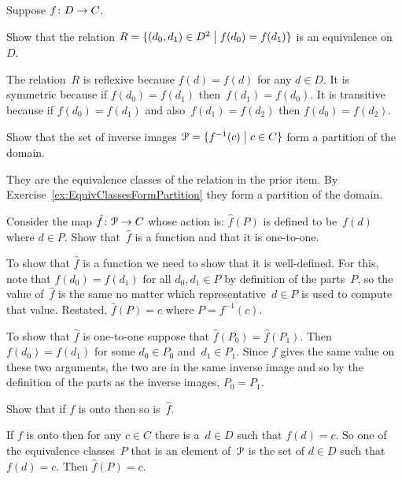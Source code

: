 \documentclass{ibl}  %
\begin{document}
\begin{problem}
Suppose $\mbox{$f\colon D\to C$}$.
\begin{exes}
\begin{exercise} 
  Show that the relation
  $R=\{(d_0,d_1)\in D^2 \bigm| f(d_0)=f(d_1)\}$ 
  is an equivalence on~$D$.
\end{exercise} 
\begin{answer}
  The relation~$R$ is reflexive because $f(d)=f(d)$ for any $d\in D$.
  It is symmetric because if $f(d_0)=f(d_1)$ then~$f(d_1)=f(d_0)$.
  It is transitive because if $f(d_0)=f(d_1)$ and also~$f(d_1)=f(d_2)$ 
  then $f(d_0)=f(d_2)$.  
\end{answer}
\begin{exercise} 
  Show that the set of inverse images 
  $\EuScript{P}=\{f^{-1}(c) \bigm| c\in C\}$ form a partition of the domain.
\end{exercise}
\begin{answer}
  They are the equivalence classes of the relation in the prior 
  item.
  By Exercise~\ref{ex:EquivClassesFormPartition} they form a
  partition of the domain.  
\end{answer}
\begin{exercise} 
  Consider the map
  $\mbox{$\hat{f}\colon \EuScript{P}\to C$}$ whose action is:
  $\hat{f}(P)$ is defined to be~$f(d)$ where $d\in P$.
  Show that~$\hat{f}$ is a function and that it is one-to-one.
\end{exercise}
\begin{answer}
  To show that $\hat{f}$ is a function we need to show that
  it is well-defined.
  For this, note that $f(d_0)=f(d_1)$ for all $d_0,d_1\in P$
  by definition of the parts~$P$, so 
  the value of~$\hat{f}$ is the same no matter which representative~$d\in P$
  is used to compute that value.
  Restated, $\hat{f}(P)=c$ where $P=f^{-1}(c)$.

  To show that $\hat{f}$ is one-to-one suppose that $\hat{f}(P_0)=\hat{f}(P_1)$.
  Then $f(d_0)=f(d_1)$ for some $d_0\in P_0$ and~$d_1\in P_1$.
  Since $f$ gives the same value on these two arguments,
  the two are in the same inverse image and so  
  by the definition of the parts as the inverse images,
  $P_0=P_1$.  
\end{answer}
\begin{exercise} 
  Show that if $f$ is onto then so is~$\hat{f}$.
\end{exercise}
\begin{answer}
  If $f$ is onto then for any $c\in C$ there is a~$d\in D$
  such that $f(d)=c$.
  So one of the equivalence classes~$P$ that is an element of~$\EuScript{P}$ 
  is the set of 
  $d\in D$ such that $f(d)=c$.
  Then $\hat{f}(P)=c$.  
\end{answer}
\end{exes}
\end{problem}
\end{document}
